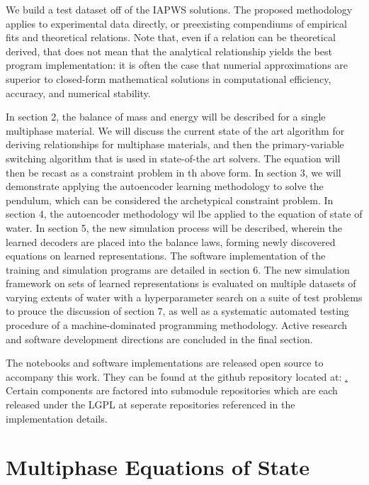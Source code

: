 \documentclass[]{article}
\begin{document}
We build a test dataset off of the IAPWS solutions. The proposed
methodology applies to experimental data directly, or preexisting
compendiums of empirical fits and theoretical relations.
Note that, even if a relation can be theoretical derived, that does
not mean that the analytical relationship yields the best program
implementation: it is often the case that numerial approximations are
superior to closed-form mathematical solutions in computational
efficiency, accuracy, and numerical stability.

In section 2, the balance of mass and energy will be described for a
single multiphase material. We will discuss the current state of the
art algorithm for deriving relationships for multiphase materials, and
then the primary-variable switching algorithm that is used in
state-of-the art solvers. The equation will then be recast as a
constraint problem in th above form.
In section 3, we will demonstrate applying the autoencoder learning
methodology to solve the pendulum,
which can be considered the archetypical constraint problem.
In section 4, the autoencoder methodology wil lbe applied to the
equation of state of water. In section 5, the new simulation process
will be described, wherein the learned decoders are placed into the
balance laws, forming newly discovered equations on learned
representations. The software implementation of the training and
simulation programs are detailed in section 6. The new simulation
framework on sets of learned representations is evaluated on
multiple datasets of varying extents of water with a
hyperparameter search on a suite of test problems to prouce the discussion of section 7, as
well as a systematic automated testing procedure of a
machine-dominated programming methodology.
Active research and software development directions are
concluded in the final section.

The notebooks and software implementations are released open source to
accompany this work. They can be found at the github repository
located at: \href{https://github.com/afqueiruga/latentsim}.
Certain components are factored into submodule repositories which are
each released under the LGPL at seperate repositories referenced in
the implementation details.

\section{Multiphase Equations of State}

\end{document}
